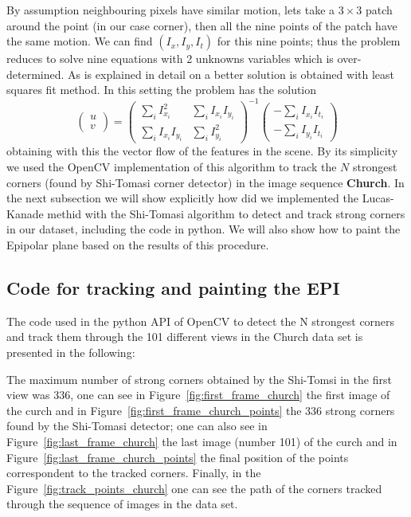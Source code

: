 \begin{itemize}
\bigskip

By assumption neighbouring pixels have similar motion, lets take a $3\times 3$ patch around the point (in our case corner), then all the nine points of the patch have the same motion. We can find $(I_x,I_y,I_t)$ for this nine points; thus the problem reduces to solve nine equations with 2 unknowns variables which is over-determined. As is explained in detail on \cite{LucasKanade} a better solution is obtained with least squares fit method. In this setting the problem has the solution
\begin{equation}
\label{eq:C2S5E13}
\left( 
\begin{matrix}
u \\
v 
\end{matrix}
\right) = 
\left(
\begin{matrix}
\sum_i I_{x_i}^2 & \sum_i I_{x_i}I_{y_i} \\
\sum_i I_{x_i}I_{y_i} & \sum_i I_{y_i}^2 
\end{matrix}
\right)^{-1}
\left(
\begin{matrix}
-\sum_i I_{x_i}I_{t_i}\\
-\sum_i I_{y_i}I_{t_i}
\end{matrix}
\right)
\end{equation}
obtaining with this the vector flow of the features in the scene. By its simplicity we used the OpenCV implementation of this algorithm to track the $N$ strongest corners (found by Shi-Tomasi corner detector) in the image sequence \textbf{Church}. In the next subsection we will show explicitly how did we implemented the Lucas-Kanade methid with the Shi-Tomasi algorithm to detect and track strong corners in our dataset, including the code in python. We will also show how to paint the Epipolar plane based on the results of this procedure. 
\end{itemize}
 
\subsection{Code for tracking and painting the EPI}

The code used in the python API of OpenCV to detect the N strongest corners and track them through the 101 different views in the Church data set is presented in the following:



The maximum number of strong corners obtained by the Shi-Tomsi in the first view was 336, one can see in Figure~\ref{fig:first_frame_church} the first image of the curch and in Figure~\ref{fig:first_frame_church_points} the 336 strong corners found by the Shi-Tomasi detector; one can also see in Figure~\ref{fig:last_frame_church} the last image (number 101) of the curch and in Figure~\ref{fig:last_frame_church_points} the final position of the points correspondent to the tracked corners. Finally, in the Figure~\ref{fig:track_points_church} one can see the path of the corners tracked through the sequence of images in the data set.

